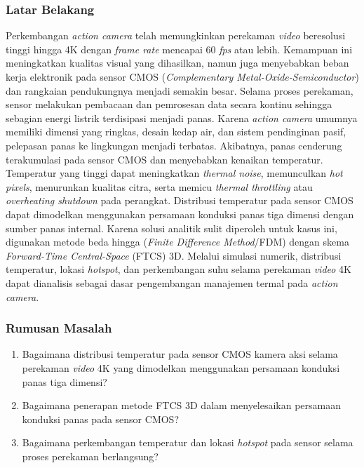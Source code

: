 \documentclass[11pt,a4paper]{article}
\begin{document}
\subsubsection{Latar Belakang}
Perkembangan \textit{action camera} telah memungkinkan perekaman \textit{video} beresolusi tinggi hingga 4K dengan \textit{frame rate} mencapai 60 \textit{fps} atau lebih. Kemampuan ini meningkatkan kualitas visual yang dihasilkan, namun juga menyebabkan beban kerja elektronik pada sensor CMOS (\textit{Complementary Metal-Oxide-Semiconductor}) dan rangkaian pendukungnya menjadi semakin besar. Selama proses perekaman, sensor melakukan pembacaan dan pemrosesan data secara kontinu sehingga sebagian energi listrik terdisipasi menjadi panas. Karena \textit{action camera} umumnya memiliki dimensi yang ringkas, desain kedap air, dan sistem pendinginan pasif, pelepasan panas ke lingkungan menjadi terbatas. Akibatnya, panas cenderung terakumulasi pada sensor CMOS dan menyebabkan kenaikan temperatur. Temperatur yang tinggi dapat meningkatkan \textit{thermal noise}, memunculkan \textit{hot pixels}, menurunkan kualitas citra, serta memicu \textit{thermal throttling} atau \textit{overheating shutdown} pada perangkat. Distribusi temperatur pada sensor CMOS dapat dimodelkan menggunakan persamaan konduksi panas tiga dimensi dengan sumber panas internal. Karena solusi analitik sulit diperoleh untuk kasus ini, digunakan metode beda hingga (\textit{Finite Difference Method}/FDM) dengan skema \textit{Forward-Time Central-Space} (FTCS) 3D. Melalui simulasi numerik, distribusi temperatur, lokasi \textit{hotspot}, dan perkembangan suhu selama perekaman \textit{video} 4K dapat dianalisis sebagai dasar pengembangan manajemen termal pada \textit{action camera}.

\subsubsection{Rumusan Masalah}
\begin{enumerate}[itemsep=1pt,topsep=2pt]
\item Bagaimana distribusi temperatur pada sensor CMOS kamera aksi selama perekaman \textit{video} 4K yang dimodelkan menggunakan persamaan konduksi panas tiga dimensi?
\item Bagaimana penerapan metode FTCS 3D dalam menyelesaikan persamaan konduksi panas pada sensor CMOS?
\item Bagaimana perkembangan temperatur dan lokasi \textit{hotspot} pada sensor selama proses perekaman berlangsung?
\end{enumerate}
\end{document}
